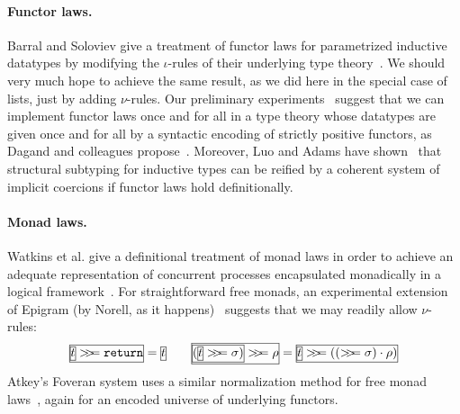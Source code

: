 \documentclass[preprint]{sigplanconf}
\begin{document}
\paragraph{Functor laws.} Barral and Soloviev give a treatment of
functor laws for parametrized inductive datatypes by modifying the
$\iota$-rules of their underlying type
theory~\cite{DBLP:conf/csr/BarralS06}.  We should very much hope to
achieve the same result, as we did here in the special case of lists,
just by adding $\nu$-rules. Our preliminary
experiments~\cite{PigWeekNu} suggest that we can implement functor
laws once and for all in a type theory whose datatypes are given once
and for all by a syntactic encoding of strictly positive functors, as
Dagand and colleagues propose~\cite{LevitationPaper,ElabData}.  Moreover, Luo
and Adams have shown~\cite{DBLP:journals/mscs/LuoA08} that structural
subtyping for inductive types can be reified by a coherent system of
implicit coercions if functor laws hold definitionally.

\newcommand{\bind}{>\!\!>\!\!=}
\paragraph{Monad laws.} Watkins et al. give a definitional treatment
of monad laws in order to achieve
an adequate representation of concurrent processes encapsulated
monadically in a logical
framework~\cite{DBLP:conf/types/WatkinsCPW03}.
For straightforward free monads, an experimental extension of Epigram (by
Norell, as it happens)~\cite{PigWeekNu} suggests that we may readily allow
$\nu$-rules:
\[
\fbb{$\fba{$t$}\bind\mathtt{return}$} = \fba{$t$}
\qquad
\fbc{\(\fbb{\((\fba{$t$}\bind \sigma)\)}\bind\rho\)} =
\fbb{\(\fba{$t$}\bind((\bind \sigma)\cdot\rho)\)}
\]
Atkey's Foveran system uses a
similar normalization method for free monad laws~\cite{FusionMonad},
again for an encoded universe of underlying functors.
\end{document}
